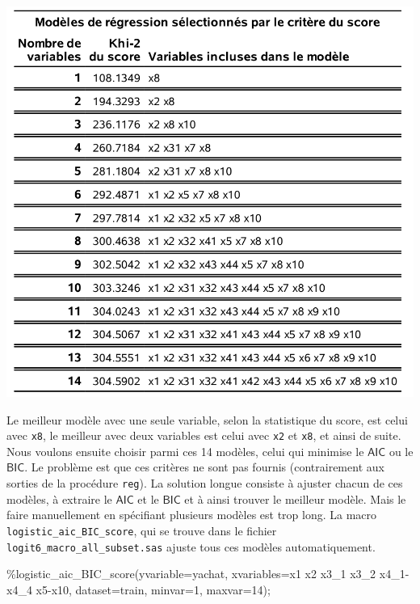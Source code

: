 \documentclass[
  11pt,
  letterpaper,
]{book}
\newenvironment{Shaded}{\begin{snugshade}}{\end{snugshade}}
\newcommand{\NormalTok}[1]{#1}
\theoremstyle{definition}
\theoremstyle{definition}
\theoremstyle{definition}
\theoremstyle{definition}
\theoremstyle{remark}
\begin{document}
\begin{center}\includegraphics[width=0.8\linewidth]{figures/03-logistic-e20} \end{center}

Le meilleur modèle avec une seule variable, selon la statistique du score, est celui avec \texttt{x8}, le meilleur avec deux variables est celui avec \texttt{x2} et \texttt{x8}, et ainsi de suite. Nous voulons ensuite choisir parmi ces 14 modèles, celui qui minimise le \(\mathsf{AIC}\) ou le \(\mathsf{BIC}\). Le problème est que ces critères ne sont pas fournis (contrairement aux sorties de la procédure \texttt{reg}). La solution longue consiste à ajuster chacun de ces modèles, à extraire le \(\mathsf{AIC}\) et le \(\mathsf{BIC}\) et à ainsi trouver le meilleur modèle. Mais le faire manuellement en spécifiant plusieurs modèles est trop long. La macro \texttt{logistic\_aic\_BIC\_score}, qui se trouve dans le fichier \texttt{logit6\_macro\_all\_subset.sas} ajuste tous ces modèles automatiquement.

\begin{Shaded}
\begin{Highlighting}[]
\NormalTok{\%logistic\_aic\_BIC\_score(yvariable=yachat,}
\NormalTok{                        xvariables=x1 x2 x3\_1 x3\_2 x4\_1{-}x4\_4 x5{-}x10,}
\NormalTok{                        dataset=train, minvar=1, maxvar=14);}
\end{Highlighting}
\end{Shaded}
\end{document}
